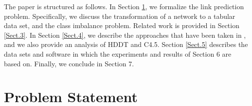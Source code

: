 \documentclass{acm_proc_article-sp}
\begin{document}
 

The paper is structured as follows. In Section \ref{Sect.2}, we formalize the link prediction problem. Specifically, we discuss the transformation of a network to a tabular data set, and the class imbalance problem. Related work is provided in Section \ref{Sect.3}. In Section \ref{Sect.4}, we describe the approaches that have been taken in \cite{Hasan06linkprediction, Lichtenwalter:2010:NPM:1835804.1835837}, and we also provide an analysis of HDDT and C4.5. Section \ref{Sect.5} describes the data sets and software in which the experiments and results of Section 6 are based on. Finally, we conclude in Section 7.  


\section{Problem Statement} 
\label{Sect.2}
\end{document}
